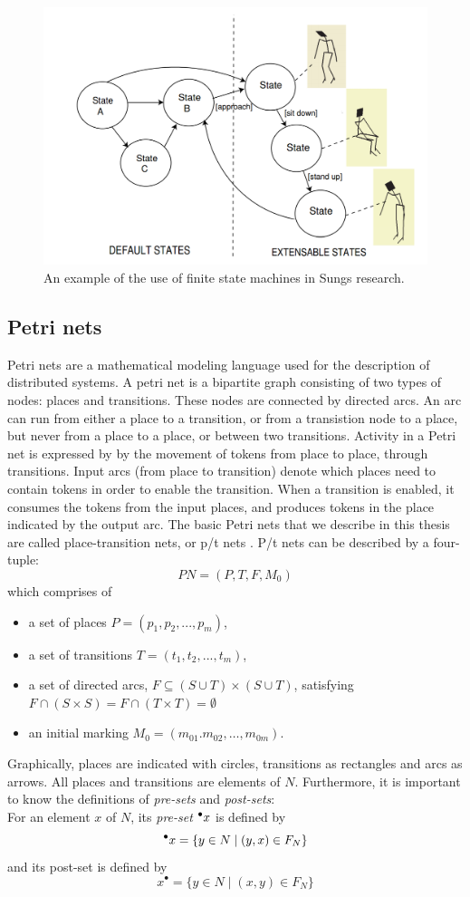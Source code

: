 \documentclass[11pt, a4paper]{book}
\begin{document}
\begin{figure}[h]
\centering
\includegraphics[width=.6\textwidth]{./statemachine_situations.png}
\caption{An example of the use of finite state machines in Sungs research.}
\label{fig:sungstatemachine}
\end{figure}


\subsection{Petri nets}
\label{sec:petrinetsrelatedwork}
Petri nets are a mathematical modeling language used for the description of distributed systems. A petri net is a bipartite graph consisting of two types of nodes: places and transitions. These nodes are connected by directed arcs. An arc can run from either a place to a transition, or from a transistion node to a place, but never from a place to a place, or between two transitions. Activity in a Petri net is expressed by by the movement of tokens from place to place, through transitions. Input arcs (from place to transition) denote which places need to contain tokens in order to enable the transition. When a transition is enabled, it consumes the tokens from the input places, and produces tokens in the place indicated by the output arc. The basic Petri nets that we describe in this thesis are called place-transition nets, or p/t nets \cite{desel1998place}.
P/t nets can be described by a four-tuple:
\[
PN = (P,T,F,M_0)
\]
which comprises of
\begin{itemize}
\item a set of places $P = (p_1, p_2, ..., p_m)$,
\item a set of transitions $T = (t_1, t_2, ...,t_m)$,
\item a set of directed arcs, $F \subseteq (S \cup T) \times (S \cup T)$, satisfying $F \cap (S \times S) = F \cap (T \times T) = \emptyset$
\item an initial marking $M_0 = (m_{01}. m_{02}, \ldots, m_{0m})$.
\end{itemize}
Graphically, places are indicated with circles, transitions as rectangles and arcs as arrows.
All places and transitions are elements of $N$. Furthermore, it is important to know the definitions of \emph{pre-sets} and \emph{post-sets}:\\
For an element $x$ of $N$, its \emph{pre-set} $\prescript{\bullet}{}{x}$ is defined by
\[
\prescript{\bullet}{}{x} = \{y \in N \mid (y,x) \in F_N\}
\]
and its post-set is defined by
\[
x^{\bullet} = \{y \in N \mid (x,y) \in F_N\}
\]
\end{document}
